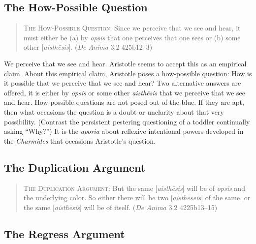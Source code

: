 
\subsection{The How-Possible Question} %
\label{sub:the_how_possible_question}

\begin{quote}
	\textsc{The How-Possible Question}: Since we perceive that we see and hear, it must either be (a) by \emph{opsis} that one perceives that one sees or (b) some other [\emph{aisthēsis}]. (\emph{De Anima} 3.2 425b12–3)
\end{quote}

We perceive that we see and hear. Aristotle seems to accept this as an empirical claim. About this empirical claim, Aristotle poses a how-possible question: How is it possible that we perceive that we see and hear? Two alternative answers are offered, it is either by \emph{opsis} or some other \emph{aisthēsis} that we perceive that we see and hear. How-possible questions are not posed out of the blue. If they are apt, then what occasions the question is a doubt or unclarity about that very possibility. (Contrast the persistent pestering questioning of a toddler continually asking ``Why?'') It is the \emph{aporia} about reflexive intentional powers developed in the \emph{Charmides} that occasions Aristotle's question.


\subsection{The Duplication Argument} %
\label{sub:the_duplication_argument}

\begin{quote}
	\textsc{The Duplication Argument}: But the same [\emph{aisthēsis}] will be of \emph{opsis} and the underlying color. So either there will be two [\emph{aisthēseis}] of the same, or the same [\emph{aisthēsis}] will be of itself. (\emph{De Anima} 3.2 4225b13–15)
\end{quote}


\subsection{The Regress Argument} %
\label{sub:the_regress_argument}

